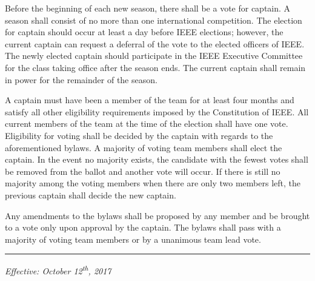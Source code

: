 \documentclass[12pt]{constitution}
\begin{document}
\label{art:elect}

Before the beginning of each new season, there shall be a vote for captain. A season shall consist of no more than one international competition. The election for captain should occur at least a day before IEEE elections; however, the current captain can request a deferral of the vote to the elected officers of IEEE. The newly elected captain should participate in the IEEE Executive Committee for the class taking office after the season ends. The current captain shall remain in power for the remainder of the season.

A captain must have been a member of the team for at least four months and satisfy all other eligibility requirements imposed by the Constitution of IEEE. All current members of the team at the time of the election shall have one vote. Eligibility for voting shall be decided by the captain with regards to the aforementioned bylaws. A majority of voting team members shall elect the captain. In the event no majority exists, the candidate with the fewest votes shall be removed from the ballot and another vote will occur. If there is still no majority among the voting members when there are only two members left, the previous captain shall decide the new captain.


\label{art:bylaw}

Any amendments to the bylaws shall be proposed by any member and be brought to a vote only upon approval by the captain. The bylaws shall pass with a majority of voting team members or by a unanimous team lead vote.

\vspace{12pt}
\hrule

\textit{Effective: October 12\textsuperscript{th}, 2017}


\setcounter{tocdepth}{1}
\end{document}
